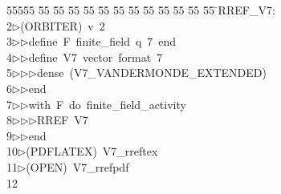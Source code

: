 %
%
\begin{tabbing}
55555 \= 55 \= 55 \= 55 \= 55 \= 55 \= 55 \= 55 \= 55 \= 55 \= 55 \= 55 \= 55 \= \>RREF\_V7:\\[0pt]
2\>$\triangleright$\>(ORBITER)\ v\ 2\ \\[0pt]
3\>$\triangleright$\>$\triangleright$\>define\ F\ finite\_field\ q\ 7\ end\ \\[0pt]
4\>$\triangleright$\>$\triangleright$\>define\ V7\ vector\ format\ 7\ \\[0pt]
5\>$\triangleright$\>$\triangleright$\>$\triangleright$\>dense\ (V7\_VANDERMONDE\_EXTENDED)\ \\[0pt]
6\>$\triangleright$\>$\triangleright$\>end\ \\[0pt]
7\>$\triangleright$\>$\triangleright$\>with\ F\ do\ finite\_field\_activity\ \\[0pt]
8\>$\triangleright$\>$\triangleright$\>$\triangleright$\>RREF\ V7\ \\[0pt]
9\>$\triangleright$\>$\triangleright$\>end\\[0pt]
10\>$\triangleright$\>(PDFLATEX)\ V7\_rreftex\\[0pt]
11\>$\triangleright$\>(OPEN)\ V7\_rrefpdf\\[0pt]
12\>\end{tabbing}
